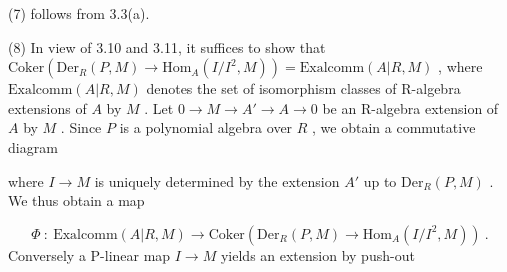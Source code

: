 (7)  follows from 3.3(a).



(8)  In view of 3.10 and 3.11, it suffices to show that $\mathrm{Coker}(\mathrm{Der}_R(P, M) \to \mathrm{Hom}_A(I/I^2, M)) = \mathrm{Exalcomm}(A|R, M)$ , where  $\mathrm{Exalcomm}(A|R, M)$ denotes the set of isomorphism classes of R-algebra extensions of  $A$  by  $M$ . Let $0 \to M \to A' \to A \to 0$   be an R-algebra extension of  $A$  by  $M$ . Since  $P$  is a polynomial algebra over  $R$ , we obtain a commutative diagram

\begin{center}
\end{center}
where  $I \to M$  is uniquely determined by the extension  $A'$  up to  $\mathrm{Der}_R(P, M)$  . We thus obtain a map

\begin{equation*}
\Phi \ : \ \mathrm{Exalcomm}(A|R, M) \to \mathrm{Coker}(\mathrm{Der}_R(P, M) \to \mathrm{Hom}_A(I/I^2, M))  \ .
\end{equation*}
Conversely a P-linear map  $I \to M$  yields an extension by push-out

